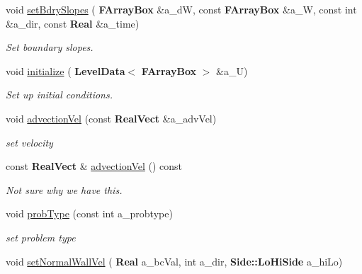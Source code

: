 \begin{DoxyCompactItemize}
void \hyperlink{class_vel_i_b_c_a39ac3b18e885c749a1081ba7042941df}{set\+Bdry\+Slopes} (\textbf{ F\+Array\+Box} \&a\+\_\+dW, const \textbf{ F\+Array\+Box} \&a\+\_\+W, const int \&a\+\_\+dir, const \textbf{ Real} \&a\+\_\+time)
\begin{DoxyCompactList}\small\item\em Set boundary slopes. \end{DoxyCompactList}\item 
void \hyperlink{class_vel_i_b_c_a0f2d126d3a569f828e0370c0c7dc6ec9}{initialize} (\textbf{ Level\+Data}$<$ \textbf{ F\+Array\+Box} $>$ \&a\+\_\+U)
\begin{DoxyCompactList}\small\item\em Set up initial conditions. \end{DoxyCompactList}\item 
\mbox{\label{class_vel_i_b_c_a6b43f398d36e8aeb1ca17d11003b57f4}} 
void \hyperlink{class_vel_i_b_c_a6b43f398d36e8aeb1ca17d11003b57f4}{advection\+Vel} (const \textbf{ Real\+Vect} \&a\+\_\+adv\+Vel)
\begin{DoxyCompactList}\small\item\em set velocity \end{DoxyCompactList}\item 
\mbox{\label{class_vel_i_b_c_a04864dfb4b0af40248b7512a27759334}} 
const \textbf{ Real\+Vect} \& \hyperlink{class_vel_i_b_c_a04864dfb4b0af40248b7512a27759334}{advection\+Vel} () const
\begin{DoxyCompactList}\small\item\em Not sure why we have this. \end{DoxyCompactList}\item 
\mbox{\label{class_vel_i_b_c_acbb613201240705e212ba21f906ba08e}} 
void \hyperlink{class_vel_i_b_c_acbb613201240705e212ba21f906ba08e}{prob\+Type} (const int a\+\_\+probtype)
\begin{DoxyCompactList}\small\item\em set problem type \end{DoxyCompactList}\item 
\mbox{\label{class_vel_i_b_c_a5f45d506e02001c6c9b2034c973dc44e}} 
void \hyperlink{class_vel_i_b_c_a5f45d506e02001c6c9b2034c973dc44e}{set\+Normal\+Wall\+Vel} (\textbf{ Real} a\+\_\+bc\+Val, int a\+\_\+dir, \textbf{ Side\+::\+Lo\+Hi\+Side} a\+\_\+hi\+Lo)

\end{DoxyCompactItemize}
